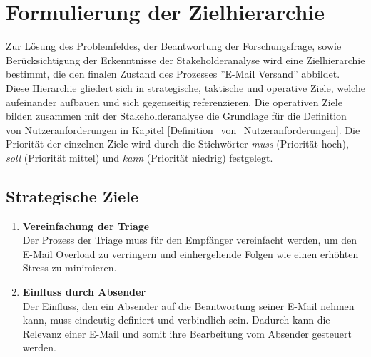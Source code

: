 
\chapter{Formulierung der Zielhierarchie}
\label{Formulierung_der_Zielhierarchie}

Zur Lösung des Problemfeldes, der Beantwortung der Forschungsfrage, sowie Berücksichtigung der Erkenntnisse der Stakeholderanalyse wird eine Zielhierarchie bestimmt, die den finalen Zustand des Prozesses ''E-Mail Versand'' abbildet. Diese Hierarchie gliedert sich in strategische, taktische und operative Ziele, welche aufeinander aufbauen und sich gegenseitig referenzieren. Die operativen Ziele bilden zusammen mit der Stakeholderanalyse die Grundlage für die Definition von Nutzeranforderungen in Kapitel \ref{Definition_von_Nutzeranforderungen}. Die Priorität der einzelnen Ziele wird durch die Stichwörter \textit{muss} (Priorität hoch), \textit{soll} (Priorität mittel) und \textit{kann} (Priorität niedrig) festgelegt.


\section{Strategische Ziele}
\begin{enumerate}[label=(\alph*)]
    \item \textbf{Vereinfachung der Triage}\\
        Der Prozess der Triage muss für den Empfänger vereinfacht werden, um den E-Mail Overload zu verringern und einhergehende Folgen wie einen erhöhten Stress zu minimieren.
        
    \item \textbf{Einfluss durch Absender}\\
        Der Einfluss, den ein Absender auf die Beantwortung seiner E-Mail nehmen kann, muss eindeutig definiert und verbindlich sein. Dadurch kann die Relevanz einer E-Mail und somit ihre Bearbeitung vom Absender gesteuert werden.
\end{enumerate}


